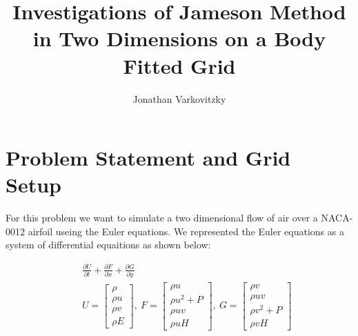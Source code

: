 \documentclass[a4paper,12pt,titlepage]{article}
\begin{document}
\title{Investigations of Jameson Method in Two Dimensions on a Body Fitted Grid}
\author{Jonathan Varkovitzky}
\maketitle


\pagestyle{plain} %
\tableofcontents

\newpage

\setcounter{page}{2}


\newpage

\section{Problem Statement and Grid Setup}

For this problem we want to simulate a two dimensional flow of air over a NACA-0012 airfoil useing the Euler equations.  We represented the Euler equations as a system of differential equaitions as shown below:

\begin{eqnarray}
&& \frac{\partial U}{\partial t} + \frac{\partial F}{\partial x} + \frac{\partial G}{\partial y}\nonumber \\
&& U = \begin{bmatrix} \rho \\ \rho u \\ \rho v \\ \rho E \end{bmatrix},\ 
   F = \begin{bmatrix} \rho u\\ \rho u^2+P\\ \rho u v \\ \rho u H\end{bmatrix},\
   G = \begin{bmatrix} \rho v\\ \rho u v\\ \rho v^2 + P \\ \rho v H\end{bmatrix}
\end{eqnarray}
\end{document}

